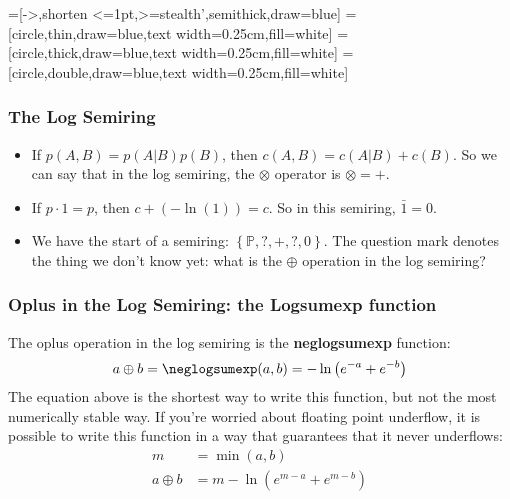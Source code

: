   \begin{center}
    =[->,shorten <=1pt,>=stealth',semithick,draw=blue]
    =[circle,thin,draw=blue,text width=0.25cm,fill=white]
    =[circle,thick,draw=blue,text width=0.25cm,fill=white]
    =[circle,double,draw=blue,text width=0.25cm,fill=white]
  \end{center}
    

  \begin{frame}
  \frametitle{The Log Semiring}

  \begin{itemize}
  \item If $p(A,B)=p(A|B)p(B)$, then $c(A,B)=c(A|B)+c(B)$.  So we can
    say that in the log semiring, the $\otimes$ operator is $\otimes=+$.
  \item If $p\cdot 1=p$, then $c+ (-\ln(1)) = c$.  So in this
    semiring, $\bar{1}=0$.
  \item We have the start of a semiring:
    $\left\{\mathbb{P},?,+,?,0\right\}$.  The question mark denotes
    the thing we don't know yet: what is the $\oplus$ operation in the
    log semiring?
  \end{itemize}
\end{frame}

\begin{frame}
  \frametitle{Oplus in the Log Semiring: the Logsumexp function}

  The oplus operation in the log semiring is the {\bf neglogsumexp}
  function:
  \begin{displaymath}
    a\oplus b=\neglogsumexp(a,b) = -\ln\left(e^{-a}+e^{-b}\right)
  \end{displaymath}
  The equation above is the shortest way to write this function, but
  not the most numerically stable way.  If you're worried about
  floating point underflow, it is possible to write this function in
  a way that guarantees that it never underflows:
  \begin{align*}
    m &= \min(a,b)\\
    a\oplus b &= m -\ln\left(e^{m-a}+e^{m-b}\right)
  \end{align*}
\end{frame}

